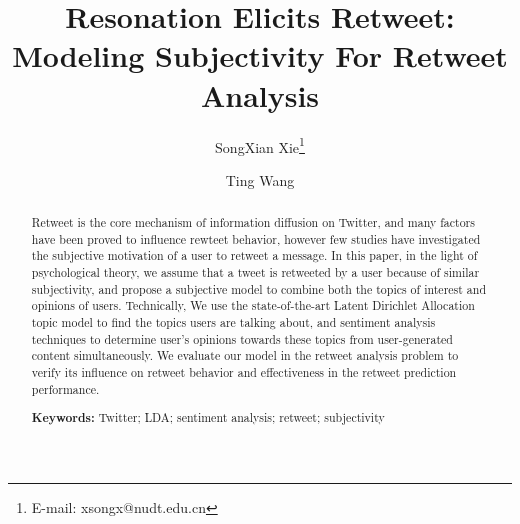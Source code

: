 \documentclass[preprint]{elsarticle}
\begin{document}
\title{Resonation Elicits Retweet: Modeling Subjectivity For Retweet Analysis}
\author{SongXian Xie\thanks{E-mail: xsongx@nudt.edu.cn}}
\author{Ting Wang}
\renewcommand\Authands{    and }
\date{}
\maketitle
\begin{abstract}
Retweet is the core mechanism of information diffusion on Twitter, and many factors have been proved to influence rewteet behavior, however few studies have investigated the subjective motivation of a user to retweet a message.
In this paper, in the light of psychological theory, we assume that a tweet is retweeted by a user because of similar subjectivity, and propose a subjective model to combine both the topics of interest and opinions of users. Technically, We use the state-of-the-art Latent Dirichlet Allocation topic model to find the topics users are talking about, and sentiment analysis techniques to determine user's opinions towards these topics from user-generated content simultaneously. 
We evaluate our model in the retweet analysis problem to verify its influence on retweet behavior and effectiveness in the retweet prediction performance. 
\begin{flushleft}
\textbf{Keywords:} Twitter; LDA; sentiment analysis; retweet; subjectivity
\end{flushleft}
\end{abstract}
\end{document}
